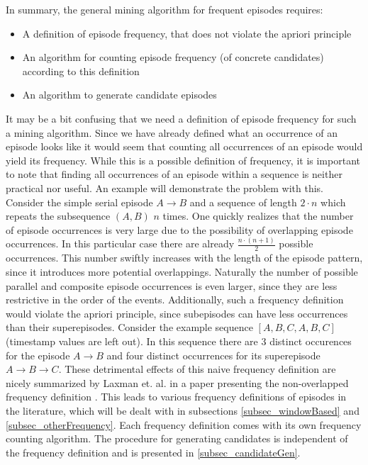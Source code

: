 In summary, the general mining algorithm for frequent episodes requires:

\begin{itemize}
	\item A definition of episode frequency, that does not violate the apriori principle
	\item An algorithm for counting episode frequency (of concrete candidates) according to this definition
	\item An algorithm to generate candidate episodes
\end{itemize}

It may be a bit confusing that we need a definition of episode frequency for such a mining algorithm. Since we have already defined what an occurrence of an episode looks like it would seem that counting all occurrences of an episode would yield its frequency. While this is a possible definition of frequency, it is important to note that finding all occurrences of an episode within a sequence is neither practical nor useful. An example will demonstrate the problem with this. Consider the simple serial episode $A \rightarrow B$ and a sequence of length $2\cdot n$ which repeats the subsequence $(A,B)$ $n$ times. One quickly realizes that the number of episode occurrences is very large due to the possibility of overlapping episode occurrences. In this particular case there are already $ \frac{n \cdot (n+1)}{2}$ possible occurrences. This number swiftly increases with the length of the episode pattern, since it introduces more potential overlappings. Naturally the number of possible parallel and composite episode occurrences is even larger, since they are less restrictive in the order of the events. Additionally, such a frequency definition would violate the apriori principle, since subepisodes can have less occurrences than their superepisodes. Consider the example sequence $[A,B,C,A,B,C]$ (timestamp values are left out). In this sequence there are 3 distinct occurences for the episode $A \rightarrow B$ and four distinct occurrences for its superepisode $A \rightarrow B \rightarrow C$. These detrimental effects of this naive frequency definition are nicely summarized by Laxman et. al. in a paper presenting the non-overlapped frequency definition \cite{laxman2007fast}. \newline
This leads to various frequency definitions of episodes in the literature, which will be dealt with in subsections \ref{subsec_windowBased} and \ref{subsec_otherFrequency}. Each frequency definition comes with its own frequency counting algorithm. The procedure for generating candidates is independent of the frequency definition and is presented in \ref{subsec_candidateGen}. \newline


